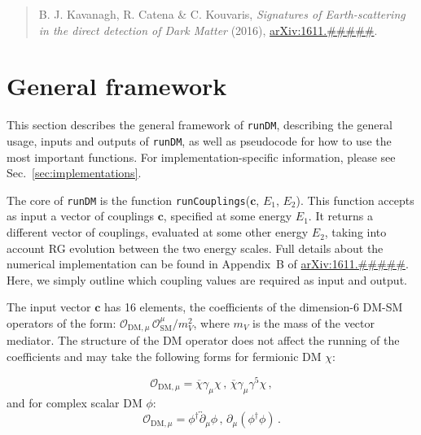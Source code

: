 \documentclass[notitlepage,12pt]{article}
\newcommand{\runDM}{\texttt{runDM}\xspace}
\newcommand{\ourpaper}{\href{http://arxiv.org/abs/1611.#####}{arXiv:1611.#####}\xspace}
\begin{document}
\begin{quote}

B. J. Kavanagh, R. Catena \& C. Kouvaris, \textit{Signatures of Earth-scattering in the direct detection of Dark Matter} (2016), \ourpaper.
\end{quote}



\section{General framework}

This section describes the general framework of \runDM, describing the general usage, inputs and outputs of \runDM, as well as pseudocode for how to use the most important functions. For implementation-specific information, please see Sec.~\ref{sec:implementations}.

The core of \runDM is the function \texttt{runCouplings}($\mathbf{c}$, $E_1$, $E_2$). This function accepts as input a vector of couplings $\mathbf{c}$, specified at some energy $E_1$. It returns a different vector of couplings, evaluated at some other energy $E_2$, taking into account RG evolution between the two energy scales. Full details about the numerical implementation can be found in Appendix~B of \ourpaper. Here, we simply outline which coupling values are required as input and output.

The input vector  $\mathbf{c}$ has 16 elements, the coefficients of the dimension-6 DM-SM operators of the form: $\mathcal{O}_{\mathrm{DM},\mu} \, \mathcal{O}_\mathrm{SM}^\mu/m_V^2$, where $m_V$ is the mass of the vector mediator. The structure of the DM operator does not affect the running of the coefficients and may take the following forms for fermionic DM $\chi$:

\begin{equation}
\mathcal{O}_{\mathrm{DM},\mu} = \overline{\chi}\gamma_\mu \chi\,, \,\overline{\chi} \gamma_\mu \gamma^5 \chi\,,
\end{equation}
and for complex scalar DM $\phi$:
\begin{equation}
\mathcal{O}_{\mathrm{DM},\mu} = \phi^\dagger \overleftrightarrow{\partial}_\mu \phi\, , \, \partial_\mu (\phi^\dagger \phi)\,.\end{equation}
\end{document}
